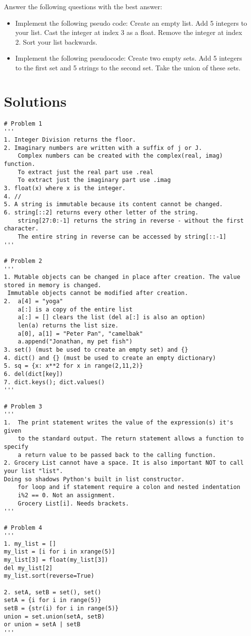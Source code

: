 \begin{problem}
Answer the following questions with the best answer:

\begin{itemize}
\item Implement the following pseudo code: Create an empty list. 
Add 5 integers to your list. 
Cast the integer at index 3 as a float.
Remove the integer at index 2. 
Sort your list backwards. 
\item Implement the following pseudocode: Create two empty sets.
Add 5 integers to the first set and 5 strings to the second set.
Take the union of these sets.

\end{itemize}
\end{problem}




\newpage
\section{Solutions}

\begin{lstlisting}
# Problem 1
'''
1. Integer Division returns the floor.
2. Imaginary numbers are written with a suffix of j or J.
	Complex numbers can be created with the complex(real, imag) function.
	To extract just the real part use .real
	To extract just the imaginary part use .imag
3. float(x) where x is the integer.
4. //
5. A string is immutable because its content cannot be changed. 
6. string[::2] returns every other letter of the string. 
	string[27:0:-1] returns the string in reverse - without the first character.
	The entire string in reverse can be accessed by string[::-1]
'''

# Problem 2	
'''
1. Mutable objects can be changed in place after creation. The value stored in memory is changed.
 Immutable objects cannot be modified after creation. 
2.  a[4] = "yoga"
	a[:] is a copy of the entire list
	a[:] = [] clears the list (del a[:] is also an option)
	len(a) returns the list size. 
	a[0], a[1] = "Peter Pan", "camelbak"
	a.append("Jonathan, my pet fish")
3. set() (must be used to create an empty set) and {}
4. dict() and {} (must be used to create an empty dictionary)
5. sq = {x: x**2 for x in range(2,11,2)}
6. del(dict[key])
7. dict.keys(); dict.values()
'''

# Problem 3
'''	
1. 	The print statement writes the value of the expression(s) it's given 
	to the standard output. The return statement allows a function to specify 
	a return value to be passed back to the calling function. 
2. Grocery List cannot have a space. It is also important NOT to call your list "list". 
Doing so shadows Python's built in list constructor. 
	for loop and if statement require a colon and nested indentation
	i%2 == 0. Not an assignment. 
	Grocery List[i]. Needs brackets.
'''

# Problem 4
'''
1. my_list = []
my_list = [i for i in xrange(5)]
my_list[3] = float(my_list[3])
del my_list[2]
my_list.sort(reverse=True)

2. setA, setB = set(), set()
setA = {i for i in range(5)}
setB = {str(i) for i in range(5)}
union = set.union(setA, setB)
or union = setA | setB
'''


\end{lstlisting}	
	